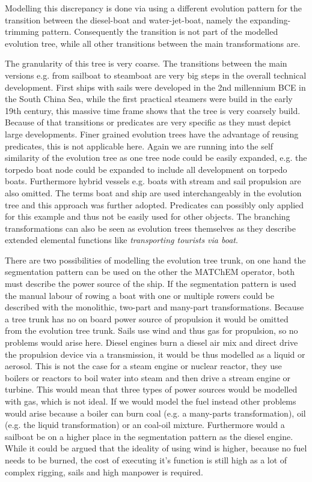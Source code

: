 \documentclass[11pt,a4paper]{article}
\begin{document}
Modelling this discrepancy is done via using a different evolution pattern for
the transition between the diesel-boat and water-jet-boat, namely the
expanding-trimming pattern. Consequently the transition is not part of the
modelled evolution tree, while all other transitions between the main
transformations are. 

The granularity of this tree is very coarse. The transitions between the main
versions e.g. from sailboat to steamboat are very big steps in the overall
technical development. First ships with sails were developed in the 2nd
millennium BCE in the South China Sea, while the first practical steamers were
build in the early 19th century, this massive time frame shows that the tree
is very coarsely build. Because of that transitions or predicates are very
specific as they must depict large developments. Finer grained evolution trees
have the advantage of reusing predicates, this is not applicable here. Again
we are running into the self similarity of the evolution tree as one tree node
could be easily expanded, e.g. the torpedo boat node could be expanded to
include all development on torpedo boats. Furthermore hybrid vessels
e.g. boats with stream and sail propulsion are also omitted. The terms boat
and ship are used interchangeably in the evolution tree and this approach was
further adopted. Predicates can possibly only applied for this example and
thus not be easily used for other objects. The branching transformations can
also be seen as evolution trees themselves as they describe extended elemental
functions like \textit{transporting tourists via boat}. 

There are two possibilities of modelling the evolution tree trunk, on one hand
the segmentation pattern can be used on the other the MATChEM operator, both
must describe the power source of the ship. If the segmentation pattern is
used the manual labour of rowing a boat with one or multiple rowers could be
described with the monolithic, two-part and many-part transformations. Because
a tree trunk has no on board power source of propulsion it would be omitted
from the evolution tree trunk. Sails use wind and thus gas for propulsion, so
no problems would arise here. Diesel engines burn a diesel air mix and direct
drive the propulsion device via a transmission, it would be thus modelled as a
liquid or aerosol. This is not the case for a steam engine or nuclear reactor,
they use boilers or reactors to boil water into steam and then drive a stream
engine or turbine. This would mean that three types of power sources would be
modelled with gas, which is not ideal. If we would model the fuel instead
other problems would arise because a boiler can burn coal (e.g. a many-parts
transformation), oil (e.g. the liquid transformation) or an coal-oil
mixture. Furthermore would a sailboat be on a higher place in the segmentation
pattern as the diesel engine. While it could be argued that the ideality of
using wind is higher, because no fuel needs to be burned, the cost of
executing it's function is still high as a lot of complex rigging, sails and
high manpower is required. 
\end{document}
